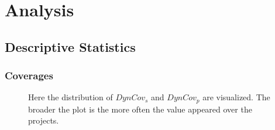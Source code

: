 \chapter{Analysis}
\section{Descriptive Statistics}
\subsection{Coverages}
\begin{figure}[!h]
    \caption[Comparison of the distribution of \(DynCov_s\) and \(DynCov_p\)]{
        Here the distribution of \(DynCov_s\) and \(DynCov_p\) are visualized.
        The broader the plot is the more often the value appeared over the projects.
    }
    
\end{figure}
\begin{comment}
    \caption[Measured ratios and speedups]{
        Measured ratios and speedups.
        This table lists the ratio of the \scops -- this means the parts which can be optimized by Polly -- according to the execution time of the tests of the project.
        \draftnote{A \enquote{X} indicates that no data is available either because the run time tests of the project or the measured project itself is broken.}
    }
\end{comment}
